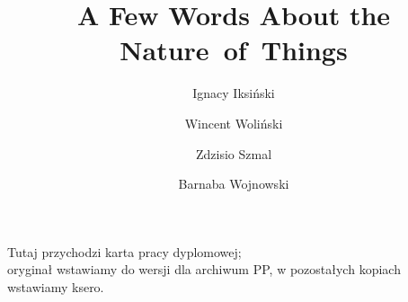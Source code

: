 \documentclass[english,bachelor,a4paper,oneside]{ppfcmthesis}
\author{%
Ignacy Iksiński \album{22222} \and
Wincent Woliński \album{22222} \and
Zdzisio Szmal \album{22222} \and
Barnaba Wojnowski \album{22222}}
\title{A Few Words About the Nature~of~Things}        %
\begin{document}
    \frontmatter\pagestyle{empty}%
    \maketitle\cleardoublepage%

    \thispagestyle{empty}\vspace*{\fill}%
    \begin{center}
        Tutaj przychodzi karta pracy dyplomowej;\\oryginał wstawiamy do wersji dla archiwum PP, w pozostałych kopiach wstawiamy ksero.
    \end{center}%
    \vfill\cleardoublepage%

    \pagestyle{ppfcmthesis}%
    \tableofcontents* \cleardoublepage%

    \mainmatter%
    

    \cleardoublepage\appendix%

    {\raggedright\sloppy\small}

    \ppcolophon
\end{document}
